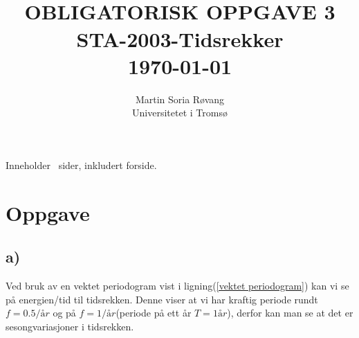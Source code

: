 
\usepackage{gensymb}
\usepackage{amsmath}
\usepackage{amsfonts}
\usepackage[section]{placeins}



{\selectfont
\title{ \normalsize \textsc{}
		\\ [1.0cm] %
        \LARGE \textbf{\uppercase{Obligatorisk Oppgave 3}
        \HRule{0.5pt} \\ [0.5cm]
        STA-2003-Tidsrekker
        \\
		\normalsize \today \vspace*{5\baselineskip}}
		}

        \date{}
\author{
		Martin Soria Røvang \\ 
        Universitetet i Tromsø\\}

\clearpage\maketitle
\vspace{0.2\textheight}
{\centering
Inneholder \pageref{LastPage} \, sider, inkludert forside.\par
}}
\thispagestyle{empty}

\newpage
\tableofcontents

\newpage

\section{Oppgave}
\subsection{a)}

Ved bruk av en vektet periodogram vist i ligning(\ref{vektet periodogram}) kan vi se på energien/tid til tidsrekken. Denne viser at vi har kraftig periode rundt $f = 0.5/år$ og på $f = 1/år$(periode på ett år $T = 1 år$), derfor kan man se at det er sesongvariasjoner i tidsrekken.

